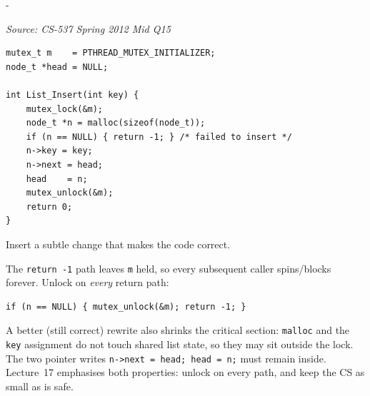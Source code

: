 \documentclass[11pt,a4paper]{article}
\makeatletter
\newcommand{\keepspace}[1]{\par\penalty-100\begingroup
  \setlength{\dimen@}{#1}\dimen@ii\pagegoal\advance\dimen@ii-\pagetotal
  \ifdim\dimen@>\dimen@ii\ifdim\dimen@ii>\z@\vfil\fi\break\fi\endgroup}
\newcounter{qn}[section]
\newenvironment{Qn}[4]{%
  \refstepcounter{qn}\keepspace{7\baselineskip}%
  \begin{tcolorbox}[qboxstyle, title={Q\thesection.\theqn\ \ [#1 \textbar\ #2]\ \ #4}]%
  {\footnotesize\color{g3}\textit{Source: #3}}\par\smallskip%
}{%
  \end{tcolorbox}%
}
\newenvironment{Sol}{%
  \begin{tcolorbox}[sboxstyle, title={Solution}]%
}{%
  \end{tcolorbox}\vspace{0.35em}%
}
\makeatother
\begin{document}
\begin{Qn}{Medium-Hard}{Lect 17}{CS-537 Spring 2012 Mid Q15}{Locked list insert that still deadlocks itself}
\begin{lstlisting}[numbers=none]
mutex_t m    = PTHREAD_MUTEX_INITIALIZER;
node_t *head = NULL;

int List_Insert(int key) {
    mutex_lock(&m);
    node_t *n = malloc(sizeof(node_t));
    if (n == NULL) { return -1; } /* failed to insert */
    n->key = key;
    n->next = head;
    head    = n;
    mutex_unlock(&m);
    return 0;
}
\end{lstlisting}

Insert a subtle change that makes the code correct.
\end{Qn}
\begin{Sol}
The \texttt{return -1} path leaves \texttt{m} held, so every subsequent caller spins/blocks forever. Unlock on \emph{every} return path:

\begin{lstlisting}[numbers=none]
if (n == NULL) { mutex_unlock(&m); return -1; }
\end{lstlisting}

A better (still correct) rewrite also shrinks the critical section: \texttt{malloc} and the \texttt{key} assignment do not touch shared list state, so they may sit outside the lock. The two pointer writes \texttt{n->next = head; head = n;} must remain inside. Lecture~17 emphasises both properties: unlock on every path, and keep the CS as small as is safe.
\end{Sol}
\end{document}
